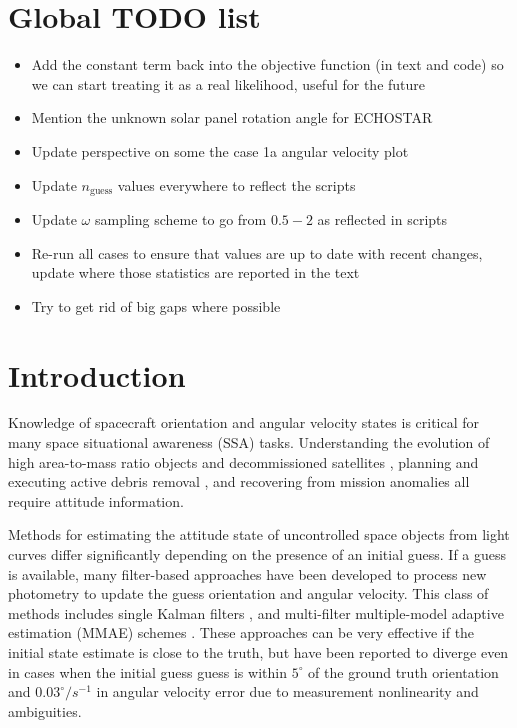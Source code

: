 \documentclass[a4paper,twocolumn]{spaceDebrisC} %
\begin{document}
\section{Global TODO list}

\begin{itemize}
  \item Add the constant term back into the objective function (in text and code) so we can start treating it as a real likelihood, useful for the future
  \item Mention the unknown solar panel rotation angle for ECHOSTAR
  \item Update perspective on some the case 1a angular velocity plot
  \item Update $n_\text{guess}$ values everywhere to reflect the scripts
  \item Update $\omega$ sampling scheme to go from $0.5-2$ as reflected in scripts
  \item Re-run all cases to ensure that values are up to date with recent changes, update where those statistics are reported in the text
  \item Try to get rid of big gaps where possible
\end{itemize}

\section{Introduction}

Knowledge of spacecraft orientation and angular velocity states is critical for many space situational awareness (SSA) tasks. Understanding the evolution of high area-to-mass ratio objects \cite{frueh2014} and decommissioned satellites \cite{rachman2023}, planning and executing active debris removal \cite{bonnal2013}, and recovering from mission anomalies \cite{umansky2023} all require attitude information. 

Methods for estimating the attitude state of uncontrolled space objects from light curves differ significantly depending on the presence of an initial guess. If a guess is available, many filter-based approaches have been developed to process new photometry to update the guess orientation and angular velocity. This class of methods includes single Kalman filters \cite{burton2021two, gagnon2024, wetterer2009}, and multi-filter multiple-model adaptive estimation (MMAE) schemes \cite{linares2014space, dianetti2020}. These approaches can be very effective if the initial state estimate is close to the truth, but have been reported to diverge even in cases when the initial guess guess is within $5^\circ$ of the ground truth orientation and $0.03^\circ/s^{-1}$ in angular velocity error \cite{gagnon2024} due to measurement nonlinearity and ambiguities.
\end{document}
